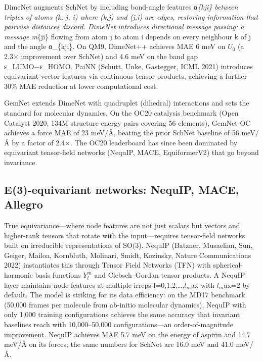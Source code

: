 \documentclass{article}
\begin{document}
DimeNet \citep{klicpera2019predictthenpropaga} augments SchNet by including bond-angle features α\emph{\{kji\} between triples of atoms (k, j, i) where (k,j) and (j,i) are edges, restoring information that pairwise distances discard. DimeNet introduces directional message passing: a message m}\{ji\} flowing from atom j to atom i depends on every neighbour k of j and the angle α\_\{kji\}. On QM9, DimeNet++ achieves MAE 6 meV on \(U_0\) (a 2.3× improvement over SchNet) and 4.6 meV on the band gap ε\_LUMO−ε\_HOMO. PaiNN (Schütt, Unke, Gastegger, ICML 2021) introduces equivariant vector features via continuous tensor products, achieving a further 30\% MAE reduction at lower computational cost.

GemNet \citep{gasteiger2021gemnetuniversaldir} extends DimeNet with quadruplet (dihedral) interactions and sets the standard for molecular dynamics. On the OC20 catalysis benchmark (Open Catalyst 2020, 134M structure-energy pairs covering 56 elements), GemNet-OC achieves a force MAE of 23 meV/Å, beating the prior SchNet baseline of 56 meV/Å by a factor of 2.4×. The OC20 leaderboard has since been dominated by equivariant tensor-field networks (NequIP, MACE, EquiformerV2) that go beyond invariance.

\subsection{E(3)-equivariant networks: NequIP, MACE, Allegro}\label{e3-equivariant-networks-nequip-mace-allegro}

True equivariance---where node features are not just scalars but vectors and higher-rank tensors that rotate with the input---requires tensor-field networks built on irreducible representations of SO(3). NequIP (Batzner, Musaelian, Sun, Geiger, Mailoa, Kornbluth, Molinari, Smidt, Kozinsky, Nature Communications 2022) instantiates this through Tensor Field Networks (TFN) with spherical-harmonic basis functions \(Y_l^m\) and Clebsch--Gordan tensor products. A NequIP layer maintains node features at multiple irreps l=0,1,2,\ldots,\(l_m\)ax with \(l_m\)ax=2 by default. The model is striking for its data efficiency: on the MD17 benchmark (50,000 frames per molecule from ab-initio molecular dynamics), NequIP with only 1,000 training configurations achieves the same accuracy that invariant baselines reach with 10,000--50,000 configurations---an order-of-magnitude improvement. NequIP achieves MAE 5.7 meV on the energy of aspirin and 14.7 meV/Å on its forces; the same numbers for SchNet are 16.0 meV and 41.0 meV/Å.
\end{document}
